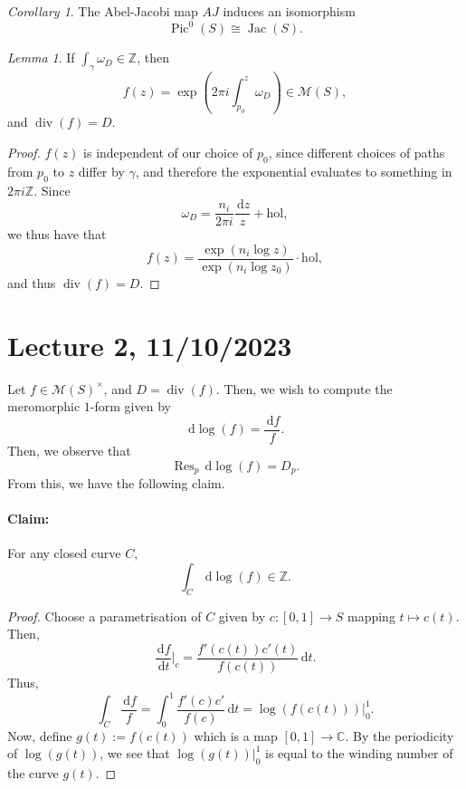 \documentclass[a4paper]{report}
\theoremstyle{definition}
\theoremstyle{remark}
\theoremstyle{proposition}
\theoremstyle{conjecture}
\theoremstyle{lemma}
\newtheorem{lemma}{Lemma}
\theoremstyle{corollary}
\newtheorem{corollary}{Corollary}
\theoremstyle{exercise}
\theoremstyle{example}
\newcommand{\C}{\mathbb{C}}
\newcommand{\mcal}{\mathcal}
\newcommand{\diff}{\,\mathrm{d}}
\newcommand{\on}{\operatorname}
\begin{document}
\begin{corollary}
    The Abel-Jacobi map $AJ$ induces an isomorphism
    $$\on{Pic}^0(S) \cong \on{Jac}(S).$$
\end{corollary}


\begin{lemma}
    If $\int_\gamma \omega_D \in \mathbb{Z}$, then 
    $$f(z) = \exp\left( 2\pi i \int_{p_0}^z\omega_D\right)\in\mcal{M}(S),$$
    and $\on{div}(f) = D$.
\end{lemma}

\begin{proof}
    $f(z)$ is independent of our choice of $p_0$, since different choices of 
    paths from $p_0$ to $z$ differ by $\gamma$, and 
    therefore the exponential evaluates to something in $2\pi i\mathbb{Z}$.
    Since $$\omega_D = \frac{n_i}{2\pi i}\frac{\diff z}{z} + \text{hol},$$
    we thus have that 
    $$f(z) = \frac{\exp(n_i\log z)}{\exp(n_i\log z_0)}\cdot \text{hol},$$
    and thus $\on{div}(f) = D$.
\end{proof}

\section{Lecture 2, 11/10/2023}

Let $f\in \mcal{M}(S)^\times$, and $D = \on{div}(f)$. Then, we wish to compute
the meromorphic $1$-form given by 
$$\diff\log(f) = \frac{\diff f}{f}.$$
Then, we observe that $$\on{Res}_p \diff \log(f) = D_p.$$
From this, we have the following claim. 
\paragraph{Claim:} For any closed curve $C$, 
$$\int_C \diff \log(f) \in \mathbb{Z}.$$
\begin{proof}
    Choose a parametrisation of $C$ given by 
    $c : [0,1] \to S$ mapping $t\mapsto c(t)$. Then,
    $$\frac{\diff f}{\diff t}\Bigg\vert_c = \frac{f'(c(t))c'(t)}{f(c(t))}\diff t.$$
    Thus, 
    $$\int_C \frac{\diff f}{f} = \int_0^1 \frac{f'(c)c'}{f(c)}\diff t = \log(f(c(t)))\bigg\vert_0^1.$$
    Now, define $g(t) := f(c(t))$ which is a map $[0,1]\to\C$.
    By the periodicity of $\log(g(t))$, we see that 
    $\log(g(t))\bigg\vert_0^1$ is equal to the winding number of the curve 
    $g(t)$.
\end{proof}
\end{document}
